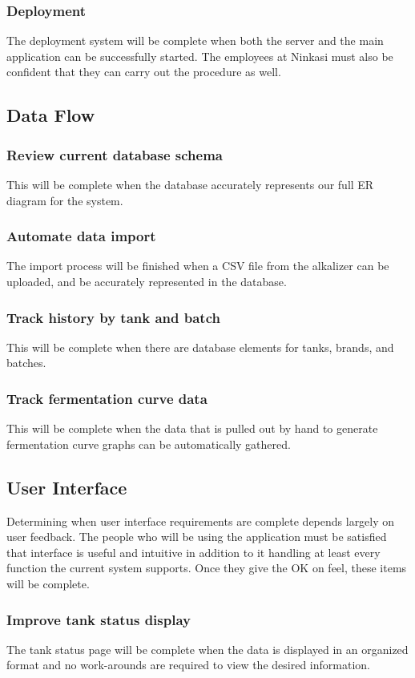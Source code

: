 \documentclass[draftclsnofoot,onecolumn,journal,letterpaper,compsoc,10pt]{IEEEtran}
\begin{document}
        \subsubsection{Deployment}
            The deployment system will be complete when both the server and the main application can be successfully started. The employees at Ninkasi must also be confident that they can carry out the procedure as well.
    \subsection{Data Flow}
        \subsubsection{Review current database schema}
            This will be complete when the database accurately represents our full ER diagram for the system.
        \subsubsection{Automate data import}
            The import process will be finished when a CSV file from the alkalizer can be uploaded, and be accurately represented in the database.
        \subsubsection{Track history by tank and batch}
            This will be complete when there are database elements for tanks, brands, and batches.
        \subsubsection{Track fermentation curve data}
            This will be complete when the data that is pulled out by hand to generate fermentation curve graphs can be automatically gathered.
    \subsection{User Interface}
        Determining when user interface requirements are complete depends largely on user feedback. The people who will be using the application must be satisfied that interface is useful and intuitive in addition to it handling at least every function the current system supports. Once they give the OK on feel, these items will be complete.
        \subsubsection{Improve tank status display}
            The tank status page will be complete when the data is displayed in an organized format and no work-arounds are required to view the desired information.
\end{document}
